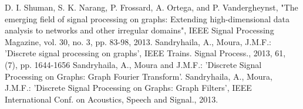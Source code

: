 \documentclass[conference]{IEEEtran}
\begin{document}

%
\begin{thebibliography}{00}
D. I. Shuman, S. K. Narang, P. Frossard, A. Ortega, and P. Vandergheynst, "The emerging field of signal processing on graphs: Extending high-dimensional data analysis to networks and other irregular domains", IEEE Signal Processing Magazine, vol. 30, no. 3, pp. 83-98, 2013.
Sandryhaila, A., Moura, J.M.F.: 'Discrete signal processing on graphs', IEEE Trains. Signal Process., 2013, 61, (7), pp. 1644-1656
Sandryhaila, A., Moura and J.M.F.: 'Discrete Signal Processing on Graphs: Graph Fourier Transform'.
Sandryhaila, A., Moura, J.M.F.: 'Discrete Signal Processing on Graphs: Graph Filters', IEEE International Conf. on Acoustics, Speech and Signal., 2013.
\end{thebibliography}
\end{document}
